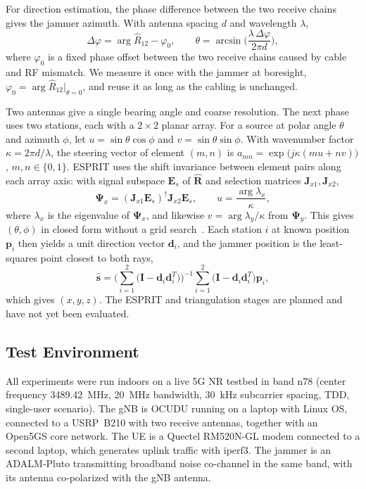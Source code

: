 \documentclass[conference]{IEEEtran}
\begin{document}
For direction estimation, the phase difference between the two receive chains
gives the jammer azimuth. With antenna spacing $d$ and wavelength $\lambda$,
\begin{equation}
\Delta\varphi=\arg\hat R_{12}-\varphi_0,\qquad
\theta=\arcsin\!\Big(\frac{\lambda\,\Delta\varphi}{2\pi d}\Big),
\end{equation}
where $\varphi_0$ is a fixed phase offset between the two receive chains caused
by cable and RF mismatch. We measure it once with the jammer at boresight,
$\varphi_0=\arg\hat R_{12}\big|_{\theta=0}$, and reuse it as long as the
cabling is unchanged.

Two antennas give a single bearing angle and coarse resolution. The next phase
uses two stations, each with a $2\times2$ planar array. For a source at polar
angle $\theta$ and azimuth $\phi$, let $u=\sin\theta\cos\phi$ and
$v=\sin\theta\sin\phi$. With wavenumber factor $\kappa=2\pi d/\lambda$, the
steering vector of element $(m,n)$ is
$a_{mn}=\exp\!\big(j\kappa(mu+nv)\big)$, $m,n\in\{0,1\}$. ESPRIT uses the
shift invariance between element pairs along each array axis: with signal
subspace $\mathbf E_s$ of $\hat{\mathbf R}$ and selection matrices
$\mathbf J_{x1},\mathbf J_{x2}$,
\begin{equation}
\boldsymbol\Psi_x=(\mathbf J_{x1}\mathbf E_s)^{\dagger}\mathbf J_{x2}\mathbf E_s,
\qquad u=\frac{\arg\lambda_x}{\kappa},
\end{equation}
where $\lambda_x$ is the eigenvalue of $\boldsymbol\Psi_x$, and likewise
$v=\arg\lambda_y/\kappa$ from $\boldsymbol\Psi_y$. This gives
$(\theta,\phi)$ in closed form without a grid search~\cite{32276}. Each
station $i$ at known position $\mathbf p_i$ then yields a unit direction vector
$\mathbf d_i$, and the jammer position is the least-squares point closest to
both rays,
\begin{equation}
\hat{\mathbf s}=\Big(\sum_{i=1}^{2}\big(\mathbf I-\mathbf d_i\mathbf d_i^{T}\big)\Big)^{-1}
\sum_{i=1}^{2}\big(\mathbf I-\mathbf d_i\mathbf d_i^{T}\big)\mathbf p_i,
\end{equation}
which gives $(x,y,z)$. The ESPRIT and triangulation stages are planned and have
not yet been evaluated.

\subsection{Test Environment}

All experiments were run indoors on a live 5G NR testbed in band n78 (center
frequency 3489.42~MHz, 20~MHz bandwidth, 30~kHz subcarrier spacing, TDD,
single-user scenario). The gNB is OCUDU running on a laptop with Linux OS,
connected to a USRP~B210 with two receive antennas, together with an Open5GS
core network. The UE is a Quectel RM520N-GL modem connected to a second
laptop, which generates uplink traffic with iperf3. The jammer is an
ADALM-Pluto transmitting broadband noise co-channel in the same band, with its
antenna co-polarized with the gNB antenna.
\end{document}
